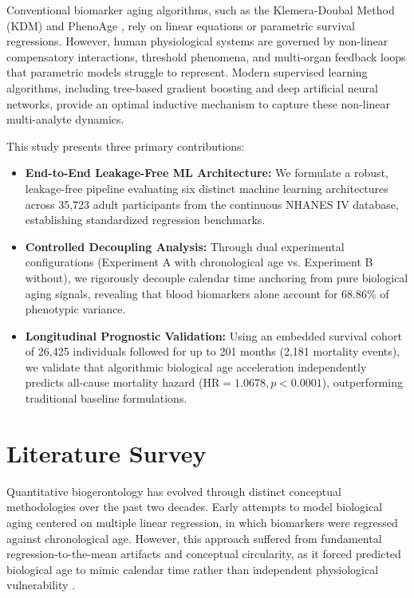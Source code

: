 \documentclass[conference]{IEEEtran}
\begin{document}
Conventional biomarker aging algorithms, such as the Klemera-Doubal Method (KDM) \cite{klemera2006new} and PhenoAge \cite{levine2018epigenetic}, rely on linear equations or parametric survival regressions. However, human physiological systems are governed by non-linear compensatory interactions, threshold phenomena, and multi-organ feedback loops that parametric models struggle to represent. Modern supervised learning algorithms, including tree-based gradient boosting and deep artificial neural networks, provide an optimal inductive mechanism to capture these non-linear multi-analyte dynamics.

This study presents three primary contributions:
\begin{itemize}
    \item \textbf{End-to-End Leakage-Free ML Architecture:} We formulate a robust, leakage-free pipeline evaluating six distinct machine learning architectures across 35,723 adult participants from the continuous NHANES IV database, establishing standardized regression benchmarks.
    \item \textbf{Controlled Decoupling Analysis:} Through dual experimental configurations (Experiment A with chronological age vs. Experiment B without), we rigorously decouple calendar time anchoring from pure biological aging signals, revealing that blood biomarkers alone account for 68.86\% of phenotypic variance.
    \item \textbf{Longitudinal Prognostic Validation:} Using an embedded survival cohort of 26,425 individuals followed for up to 201 months (2,181 mortality events), we validate that algorithmic biological age acceleration independently predicts all-cause mortality hazard ($\text{HR} = 1.0678, p < 0.0001$), outperforming traditional baseline formulations.
\end{itemize}

\section{Literature Survey}
Quantitative biogerontology has evolved through distinct conceptual methodologies over the past two decades. Early attempts to model biological aging centered on multiple linear regression, in which biomarkers were regressed against chronological age. However, this approach suffered from fundamental regression-to-the-mean artifacts and conceptual circularity, as it forced predicted biological age to mimic calendar time rather than independent physiological vulnerability \cite{nakamura1988assessment}.
\end{document}

